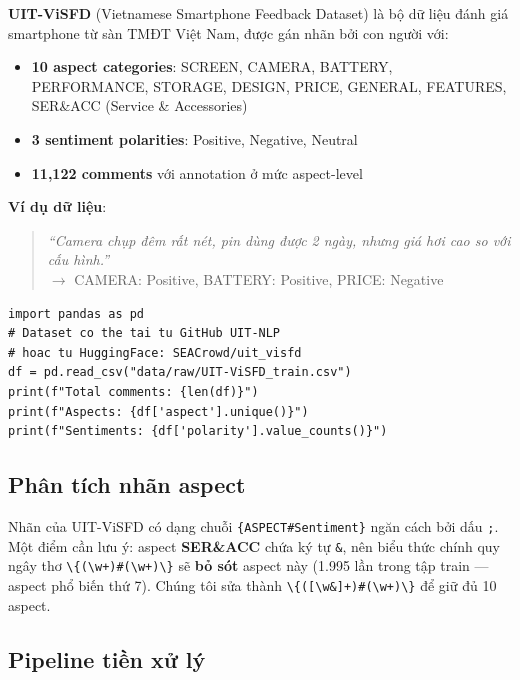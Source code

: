 \documentclass[12pt,a4paper]{article}
\begin{document}
\textbf{UIT-ViSFD} (Vietnamese Smartphone Feedback Dataset) là bộ dữ liệu đánh giá smartphone từ sàn TMĐT Việt Nam, được gán nhãn bởi con người với:

\begin{itemize}
  \item \textbf{10 aspect categories}: SCREEN, CAMERA, BATTERY, PERFORMANCE, STORAGE, DESIGN, PRICE, GENERAL, FEATURES, SER\&ACC (Service \& Accessories)
  \item \textbf{3 sentiment polarities}: Positive, Negative, Neutral
  \item \textbf{11,122 comments} với annotation ở mức aspect-level
\end{itemize}

\textbf{Ví dụ dữ liệu}:
\begin{quote}
\textit{``Camera chụp đêm rất nét, pin dùng được 2 ngày, nhưng giá hơi cao so với cấu hình.''}\\
$\rightarrow$ CAMERA: Positive, BATTERY: Positive, PRICE: Negative
\end{quote}

\begin{lstlisting}[caption={Tải và khám phá dataset UIT-ViSFD}]
import pandas as pd
# Dataset co the tai tu GitHub UIT-NLP
# hoac tu HuggingFace: SEACrowd/uit_visfd
df = pd.read_csv("data/raw/UIT-ViSFD_train.csv")
print(f"Total comments: {len(df)}")
print(f"Aspects: {df['aspect'].unique()}")
print(f"Sentiments: {df['polarity'].value_counts()}")
\end{lstlisting}

\subsection{Phân tích nhãn aspect}

Nhãn của UIT-ViSFD có dạng chuỗi \texttt{\{ASPECT\#Sentiment\}} ngăn cách bởi dấu \texttt{;}. Một điểm cần lưu ý: aspect \textbf{SER\&ACC} chứa ký tự \texttt{\&}, nên biểu thức chính quy ngây thơ \texttt{\textbackslash\{(\textbackslash w+)\#(\textbackslash w+)\textbackslash\}} sẽ \textbf{bỏ sót} aspect này (1.995 lần trong tập train --- aspect phổ biến thứ 7). Chúng tôi sửa thành \texttt{\textbackslash\{([\textbackslash w\&]+)\#(\textbackslash w+)\textbackslash\}} để giữ đủ 10 aspect.

\subsection{Pipeline tiền xử lý}
\end{document}
